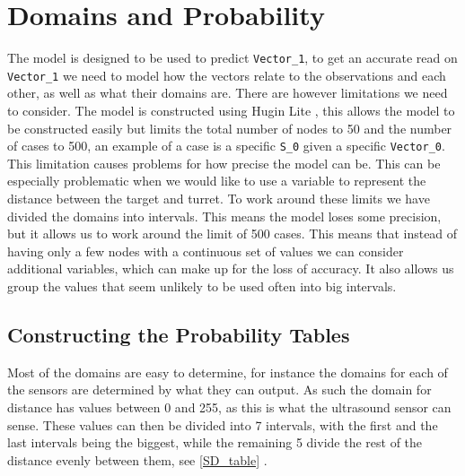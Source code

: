 \section{Domains and Probability}

The model is designed to be used to predict \texttt{Vector\_1}, to get an
accurate read on \texttt{Vector\_1} we need to model how the vectors relate to
the observations and each other, as well as what their domains are. There are
however limitations we need to consider. The model is constructed using Hugin
Lite \citep{Hugin}, this allows the model to be constructed easily but limits
the total number of nodes to 50 and the number of cases to 500, an example of a
case is a specific \texttt{S\_0} given a specific \texttt{Vector\_0}. This
limitation causes problems for how precise the model can be. This can be
especially problematic when we would like to use a variable to represent the
distance between the target and turret. To work around these limits we have
divided the domains into intervals. This means the model loses some precision,
but it allows us to work around the limit of 500 cases. This means that instead
of having only a few nodes with a continuous set of values we can consider
additional variables, which can make up for the loss of accuracy. It also allows
us group the values that seem unlikely to be used often into big intervals.

\subsection{Constructing the Probability Tables}

Most of the domains are easy to determine, for instance the domains for each of
the sensors are determined by what they can output. As such the domain for
distance has values between 0 and 255, as this is what the ultrasound sensor
can sense. These values can then be divided into 7 intervals, with the first and
the last intervals being the biggest, while the remaining 5 divide the rest of
the distance evenly between them, see \autoref{SD_table} .

